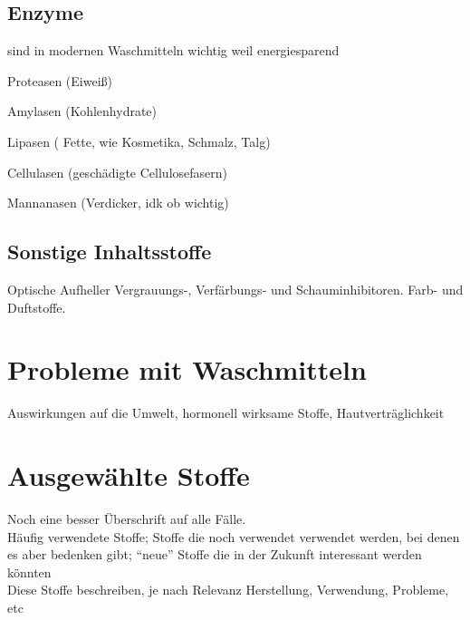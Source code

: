 \documentclass[12pt, ngerman]{article}
\begin{document}
\subsection{Enzyme}

sind in modernen Waschmitteln wichtig weil energiesparend

Proteasen (Eiweiß)

Amylasen (Kohlenhydrate)

Lipasen ( Fette, wie Kosmetika, Schmalz, Talg)

Cellulasen (geschädigte Cellulosefasern)

Mannanasen (Verdicker, idk ob wichtig)

\subsection{Sonstige Inhaltsstoffe}
Optische Aufheller
Vergrauungs-, Verfärbungs- und Schauminhibitoren. Farb- und Duftstoffe.


\section{Probleme mit Waschmitteln}
Auswirkungen auf die Umwelt, hormonell wirksame Stoffe, Hautverträglichkeit

\section{Ausgewählte Stoffe}
Noch eine besser Überschrift auf alle Fälle.\\

Häufig verwendete Stoffe; Stoffe die noch verwendet verwendet werden, bei denen es aber bedenken gibt; "`neue"' Stoffe die in der Zukunft interessant werden könnten\\

Diese Stoffe beschreiben, je nach Relevanz Herstellung, Verwendung, Probleme, etc






\clearpage
\nocite{*}
\printbibliography[title=\section{Literaturverzeichnis}]
\end{document}
